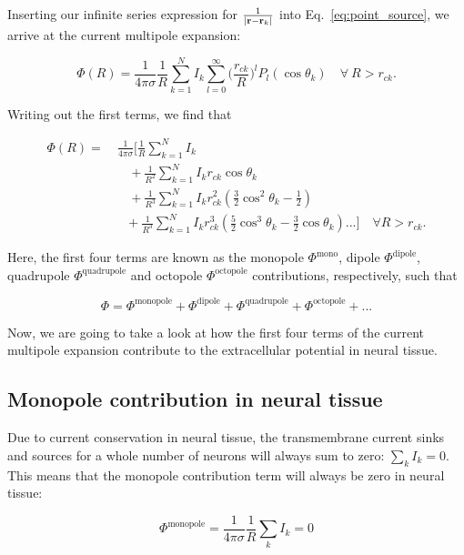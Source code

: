 Inserting our infinite series expression for $\frac{1}{|{\bf r} - {\bf r}_k|}$ into Eq.~\ref{eq:point_source}, we arrive at the current multipole expansion:

\begin{equation}\label{eq:multipole_compact}
\Phi (R) = \frac{1}{4 \pi \sigma}\frac{1}{R} \sum_{k=1}^N I_k \sum_{l = 0}^\infty \big(\frac{r_{ck}}{R}\big)^l P_l(\cos \theta_k) \quad \forall~ R > r_{ck}.
\end{equation}

Writing out the first terms, we find that

\begin{align}\label{eq:multipole}
\Phi(R) =~& 
\frac{1}{4 \pi \sigma} \Bigg[\frac{1}{R} \sum_{k=1}^N I_k \nonumber\\
&~~~~+ \frac{1}{R^2} \sum_{k=1}^N I_k r_{ck} \cos \theta_k \\
&~~~~+  \frac{1}{R^3} \sum_{k=1}^N I_k r_{ck}^2 \left( \frac{3}{2} \cos^2 \theta_k - \frac{1}{2} \right) \nonumber \\
&~~~ +  \frac{1}{R^3} \sum_{k=1}^N I_k r_{ck}^3 \left( \frac{5}{2} \cos^3 \theta_k - \frac{3}{2} \cos \theta_k \right) ... \nonumber \Bigg] \quad \forall R > r_{ck}.
\end{align}

Here, the first four terms are known as the monopole $\Phi^{\mathrm{mono}}$, dipole $\Phi^{\mathrm{dipole}}$, quadrupole $\Phi^{\mathrm{quadrupole}}$ and octopole $\Phi^{\mathrm{octopole}}$ contributions, respectively, such that

\begin{equation}
\Phi = \Phi^{\mathrm{monopole}} + \Phi^{\mathrm{dipole}} + \Phi^{\mathrm{quadrupole}} + \Phi^{\mathrm{octopole}} + ...
\end{equation}

Now, we are going to take a look at how the first four terms of the current multipole expansion contribute to the extracellular potential in neural tissue.

\subsection{Monopole contribution in neural tissue}\label{subsec:mono}
Due to current conservation in neural tissue, the transmembrane current sinks and sources for a whole number of neurons will always sum to zero: $\sum_k I_k = 0$. This means that the monopole contribution term will always be zero in neural tissue:

\begin{equation*}
\Phi^{\mathrm{monopole}} = \frac{1}{4 \pi \sigma} \frac{1}{R} \sum_k I_k = 0
\end{equation*}

